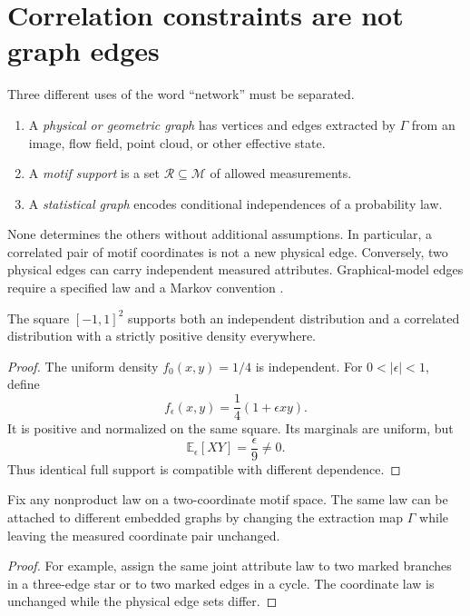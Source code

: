 \documentclass[11pt]{article}
\newcommand{\Image}{\mathcal R}
\newcommand{\Motif}{\mathcal M}
\newcommand{\E}{\mathbb E}
\begin{document}
\section{Correlation constraints are not graph edges}

Three different uses of the word ``network'' must be separated.

\begin{enumerate}
\item A \emph{physical or geometric graph} has vertices and edges extracted
by $\Gamma$ from an image, flow field, point cloud, or other effective
state.
\item A \emph{motif support} is a set $\Image\subseteq\Motif$ of allowed
measurements.
\item A \emph{statistical graph} encodes conditional independences of a
probability law.
\end{enumerate}

None determines the others without additional assumptions.  In particular,
a correlated pair of motif coordinates is not a new physical edge.
Conversely, two physical edges can carry independent measured attributes.
Graphical-model edges require a specified law and a Markov convention
\cite{lauritzen1996}.

\begin{proposition}
The square $[-1,1]^2$ supports both an independent distribution and a
correlated distribution with a strictly positive density everywhere.
\end{proposition}

\begin{proof}
The uniform density $f_0(x,y)=1/4$ is independent.  For
$0<|\epsilon|<1$, define
\[
  f_\epsilon(x,y)=\frac14(1+\epsilon xy).
\]
It is positive and normalized on the same square.  Its marginals are
uniform, but
\[
  \E_\epsilon[XY]=\frac{\epsilon}{9}\neq0.
\]
Thus identical full support is compatible with different dependence.
\end{proof}

\begin{proposition}
Fix any nonproduct law on a two-coordinate motif space.  The same law can be
attached to different embedded graphs by changing the extraction map
$\Gamma$ while leaving the measured coordinate pair unchanged.
\end{proposition}

\begin{proof}
For example, assign the same joint attribute law to two marked branches in a
three-edge star or to two marked edges in a cycle.  The coordinate law is
unchanged while the physical edge sets differ.
\end{proof}
\end{document}
